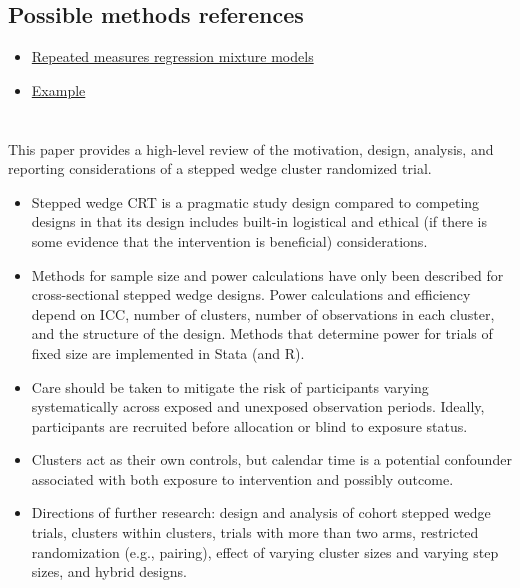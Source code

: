 \documentclass{article}
\begin{document}
\subsection{Possible methods references}

\begin{itemize}

\item
\href{https://link.springer.com/article/10.3758/s13428-019-01257-7}{Repeated measures regression mixture models}

\item
\href{https://pages.mtu.edu/~shanem/psy5220/daily/Day19/Mixture_of_regressions.html}{Example}

\end{itemize}


\newpage


\section{\textcite{Hemming:2015}}

This paper provides a high-level review of the motivation, design, analysis, and reporting considerations of a stepped wedge cluster randomized trial.

\begin{itemize}

\item
Stepped wedge CRT is a pragmatic study design compared to competing designs in that its design includes built-in logistical and ethical (if there is some evidence that the intervention is beneficial) considerations.

\item
Methods for sample size and power calculations have only been described for cross-sectional stepped wedge designs. Power calculations and efficiency depend on ICC, number of clusters, number of observations in each cluster, and the structure of the design. Methods that determine power for trials of fixed size are implemented in Stata (and R).

\item
Care should be taken to mitigate the risk of participants varying systematically across exposed and unexposed observation periods. Ideally, participants are recruited before allocation or blind to exposure status.

\item
Clusters act as their own controls, but calendar time is a potential confounder associated with both exposure to intervention and possibly outcome.

\item
Directions of further research: design and analysis of cohort stepped wedge trials, clusters within clusters, trials with more than two arms, restricted randomization (e.g., pairing), effect of varying cluster sizes and varying step sizes, and hybrid designs.

\end{itemize}
\end{document}
